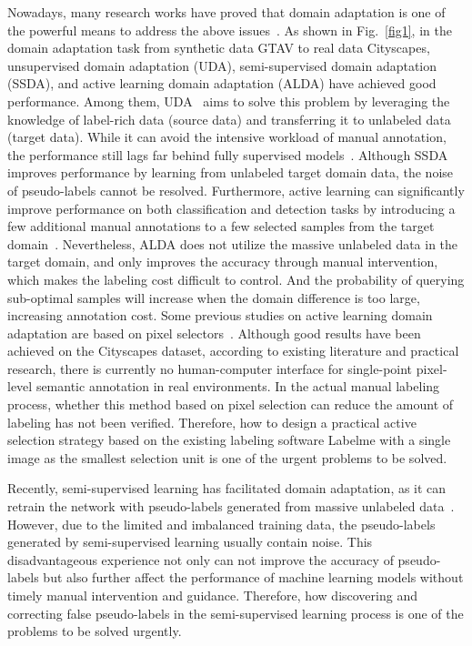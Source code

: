 \documentclass[journal]{IEEEtran}
\newcommand{\fref}[1]{Fig.~\ref{#1}}
\newcommand{\ssl}{semi-supervised learning\xspace}
\begin{document}
Nowadays, many research works have proved that domain adaptation is one of the powerful means to address the above issues~\cite{li2021generalized, vu2019advent}. As shown in \fref{fig1}, in the domain adaptation task from synthetic data GTAV to real data Cityscapes, unsupervised domain adaptation (UDA), semi-supervised domain adaptation (SSDA), and active learning domain adaptation (ALDA) have achieved good performance. Among them, UDA~\cite{huo2022domain, zhang2021transfer, song2020nighttime, liu2021source, zhang2021prototypical} aims to solve this problem by leveraging the knowledge of label-rich data (source data) and transferring it to unlabeled data (target data). While it can avoid the intensive workload of manual annotation, the performance still lags far behind fully supervised models~\cite{shin2021labor}. Although SSDA improves performance by learning from unlabeled target domain data, the noise of pseudo-labels cannot be resolved. Furthermore, active learning can significantly improve performance on both classification and detection tasks by introducing a few additional manual annotations to a few selected samples from the target domain~\cite{su2020active}. Nevertheless, ALDA does not utilize the massive unlabeled data in the target domain, and only improves the accuracy through manual intervention, which makes the labeling cost difficult to control. And the probability of querying sub-optimal samples will increase when the domain difference is too large, increasing annotation cost. Some previous studies on active learning domain adaptation are based on pixel selectors~\cite{shin2021labor}. Although good results have been achieved on the Cityscapes dataset, according to existing literature and practical research, there is currently no human-computer interface for single-point pixel-level semantic annotation in real environments. In the actual manual labeling process, whether this method based on pixel selection can reduce the amount of labeling has not been verified. Therefore, how to design a practical active selection strategy based on the existing labeling software Labelme with a single image as the smallest selection unit is one of the urgent problems to be solved.

Recently, \ssl has facilitated domain adaptation, as it can retrain the network with pseudo-labels generated from massive unlabeled data~\cite{8733203, mei2020instance, zheng2021rectifying, zou2018unsupervised, zou2019confidence}. However, due to the limited and imbalanced training data, the pseudo-labels generated by \ssl usually contain noise. This disadvantageous experience not only can not improve the accuracy of pseudo-labels but also further affect the performance of machine learning models without timely manual intervention and guidance. Therefore, how discovering and correcting false pseudo-labels in the \ssl process  is one of the problems to be solved urgently.
\end{document}
